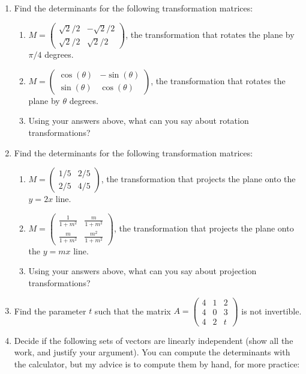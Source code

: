\documentclass[11pt]{article}     \parskip=5pt
\newcommand{\ds}{\displaystyle}
\begin{document}
\begin{enumerate}
\item Find the determinants for the following transformation matrices: 
\begin{enumerate}
\item  $\ds M=
\begin{pmatrix}
\sqrt{2}/2 & - \sqrt{2}/2 \\
\sqrt{2}/2 & \sqrt{2}/2
\end{pmatrix}$, the transformation that rotates the plane by $\pi/4$ degrees. 

\item $\ds M=
\begin{pmatrix}
\cos(\theta) & -\sin(\theta)\\
\sin(\theta) & \cos(\theta)
\end{pmatrix}$, the transformation that rotates the plane by $\theta$ degrees. 
\item Using your answers above, what can you say about rotation transformations? 
\end{enumerate}
\item Find the determinants for the following transformation matrices: 
\begin{enumerate}\item $\ds M=
\begin{pmatrix}
1/5 & 2/5\\
2/5 & 4/5
\end{pmatrix}$, the transformation that projects the plane onto the $y=2x$ line. 
\item $M=
\begin{pmatrix}
\ds \frac{1}{1+m^2} &\ds \frac{m}{1+m^2}\\
\ds \frac{m}{1+m^2}& \ds \frac{m^2}{1+m^2}
\end{pmatrix}$, the transformation that projects the plane onto the $y=mx$ line. 
\item Using your answers above, what can you say about projection transformations? 
\end{enumerate} 

\item Find the parameter $t$ such that the matrix $A=\begin{pmatrix}
4 & 1 & 2\\
4 & 0 & 3\\
4 & 2 & t
\end{pmatrix}$ 
is not invertible.


\item Decide if the following sets of vectors are linearly independent (show all the work, and justify your argument). You can compute the determinants with the calculator, but my advice is to compute them by hand, for more practice: 


\end{enumerate}
\end{document}
